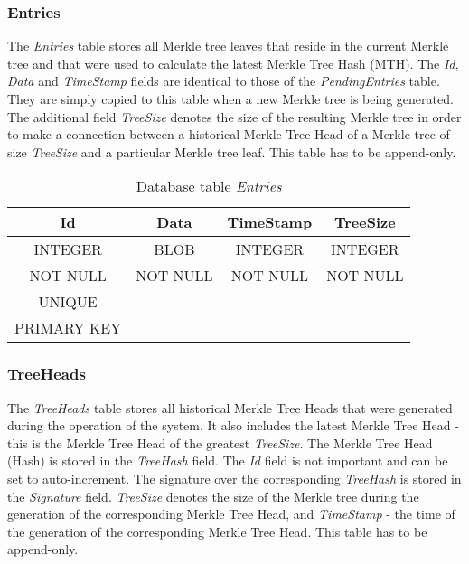 \documentclass{article}
\begin{document}
	\subsubsection{Entries}
	
	The \textit{Entries} table stores all Merkle tree leaves that reside in the current Merkle tree and that were used to calculate the latest Merkle Tree Hash (MTH). The \textit{Id}, \textit{Data} and \textit{TimeStamp} fields are identical to those of the \textit{PendingEntries} table. They are simply copied to this table when a new Merkle tree is being generated. The additional field \textit{TreeSize} denotes the size of the resulting Merkle tree in order to make a connection between a historical Merkle Tree Head of a Merkle tree of size \textit{TreeSize} and a particular Merkle tree leaf. This table has to be append-only.

	\begin{table}[H]
		\centering
		\caption{Database table \textit{Entries}}
		\label{entriesDbTable1}
		\begin{tabular}{|c|c|c|c|} \hline
			\textbf{Id}	& \textbf{Data}  & \textbf{TimeStamp} & \textbf{TreeSize} \\ \hline
			INTEGER & BLOB & INTEGER & INTEGER \\  \hline
			NOT NULL & NOT NULL & NOT NULL & NOT NULL \\
			UNIQUE &&& \\
			PRIMARY KEY &&& \\ \hline
		\end{tabular}
	\end{table}


	\subsubsection{TreeHeads}
	
	The \textit{TreeHeads} table stores all historical Merkle Tree Heads that were generated during the operation of the system. It also includes the latest Merkle Tree Head - this is the Merkle Tree Head of the greatest \textit{TreeSize}. The Merkle Tree Head (Hash) is stored in the \textit{TreeHash} field. The \textit{Id} field is not important and can be set to auto-increment. The signature over the corresponding \textit{TreeHash} is stored in the \textit{Signature} field. \textit{TreeSize} denotes the size of the Merkle tree during the generation of the corresponding Merkle Tree Head, and \textit{TimeStamp} - the time of the generation of the corresponding Merkle Tree Head. This table has to be append-only. 
	
\end{document}
